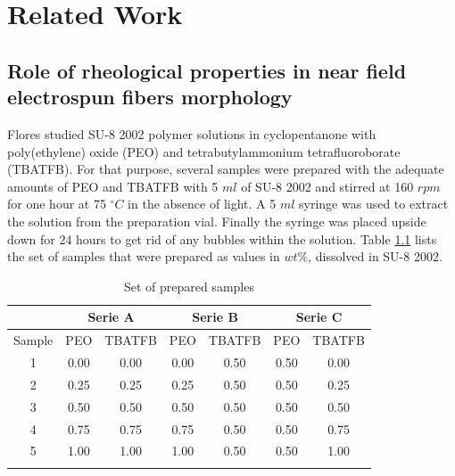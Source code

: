 
\chapter{Related Work} %

\label{Chapter:RelatedWork}



\section{Role of rheological properties in near field electrospun fibers morphology \cite{Flores2017}}

Flores studied SU-8 2002 polymer solutions in cyclopentanone with poly(ethylene) oxide (PEO) and tetrabutylammonium tetrafluoroborate (TBATFB). For that purpose, several samples were prepared with the adequate amounts of PEO and TBATFB with 5 $m l$ of SU-8 2002 and stirred at 160 $r p m$ for one hour at 75 $^\circ C$ in the absence of light. A 5 $m l$ syringe was used to extract the solution from the preparation vial. Finally the syringe was placed upside down for 24 hours to get rid of any bubbles within the solution. Table \ref{tbl:FloresSamples} lists the set of samples that were prepared as values in $w t \%$, dissolved in SU-8 2002.

\begin{table}[th]
\caption{Set of prepared samples}
\begin{center}
\begin{tabular}{ c c c c c c c } 
\hline
\text{} & \multicolumn{2}{c}{Serie A} & \multicolumn{2}{c}{Serie B} & \multicolumn{2}{c}{Serie C} \\
\hline
Sample & PEO & TBATFB & PEO & TBATFB & PEO & TBATFB \\
\hline
1 & 0.00 & 0.00 & 0.00 & 0.50 & 0.50 & 0.00 \\
2 & 0.25 & 0.25 & 0.25 & 0.50 & 0.50 & 0.25 \\
3 & 0.50 & 0.50 & 0.50 & 0.50 & 0.50 & 0.50 \\
4 & 0.75 & 0.75 & 0.75 & 0.50 & 0.50 & 0.75 \\
5 & 1.00 & 1.00 & 1.00 & 0.50 & 0.50 & 1.00 \\
\hline
\label{tbl:FloresSamples}
\end{tabular}
\end{center}
\end{table}

